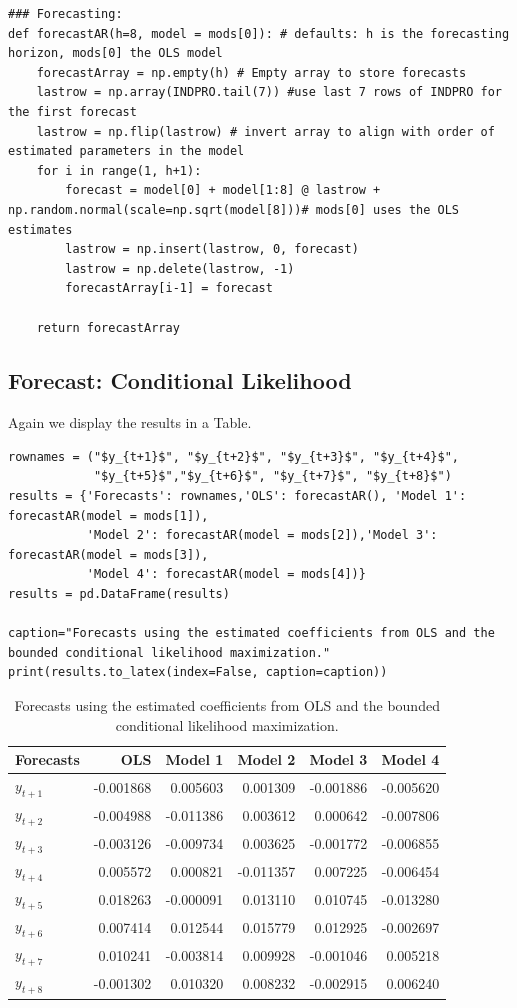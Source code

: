 \documentclass{article}
\begin{document}
\begin{verbatim}
### Forecasting:
def forecastAR(h=8, model = mods[0]): # defaults: h is the forecasting horizon, mods[0] the OLS model
    forecastArray = np.empty(h) # Empty array to store forecasts
    lastrow = np.array(INDPRO.tail(7)) #use last 7 rows of INDPRO for the first forecast
    lastrow = np.flip(lastrow) # invert array to align with order of estimated parameters in the model
    for i in range(1, h+1):
        forecast = model[0] + model[1:8] @ lastrow + np.random.normal(scale=np.sqrt(model[8]))# mods[0] uses the OLS estimates
        lastrow = np.insert(lastrow, 0, forecast)
        lastrow = np.delete(lastrow, -1)
        forecastArray[i-1] = forecast

    return forecastArray
\end{verbatim}
\subsection{Forecast: Conditional Likelihood}
Again we display the results in a Table.
\begin{verbatim}
rownames = ("$y_{t+1}$", "$y_{t+2}$", "$y_{t+3}$", "$y_{t+4}$",
            "$y_{t+5}$","$y_{t+6}$", "$y_{t+7}$", "$y_{t+8}$")
results = {'Forecasts': rownames,'OLS': forecastAR(), 'Model 1': forecastAR(model = mods[1]),
           'Model 2': forecastAR(model = mods[2]),'Model 3': forecastAR(model = mods[3]),
           'Model 4': forecastAR(model = mods[4])}
results = pd.DataFrame(results)

caption="Forecasts using the estimated coefficients from OLS and the bounded conditional likelihood maximization."
print(results.to_latex(index=False, caption=caption))
\end{verbatim}

\begin{table}[h]
\centering
\caption{Forecasts using the estimated coefficients from OLS and the bounded conditional likelihood maximization.}
\begin{tabular}{lrrrrr}
\toprule
Forecasts & OLS & Model 1 & Model 2 & Model 3 & Model 4 \\
\midrule
$y_{t+1}$ & -0.001868 & 0.005603 & 0.001309 & -0.001886 & -0.005620 \\
$y_{t+2}$ & -0.004988 & -0.011386 & 0.003612 & 0.000642 & -0.007806 \\
$y_{t+3}$ & -0.003126 & -0.009734 & 0.003625 & -0.001772 & -0.006855 \\
$y_{t+4}$ & 0.005572 & 0.000821 & -0.011357 & 0.007225 & -0.006454 \\
$y_{t+5}$ & 0.018263 & -0.000091 & 0.013110 & 0.010745 & -0.013280 \\
$y_{t+6}$ & 0.007414 & 0.012544 & 0.015779 & 0.012925 & -0.002697 \\
$y_{t+7}$ & 0.010241 & -0.003814 & 0.009928 & -0.001046 & 0.005218 \\
$y_{t+8}$ & -0.001302 & 0.010320 & 0.008232 & -0.002915 & 0.006240 \\
\bottomrule
\end{tabular}
\end{table}
\end{document}
